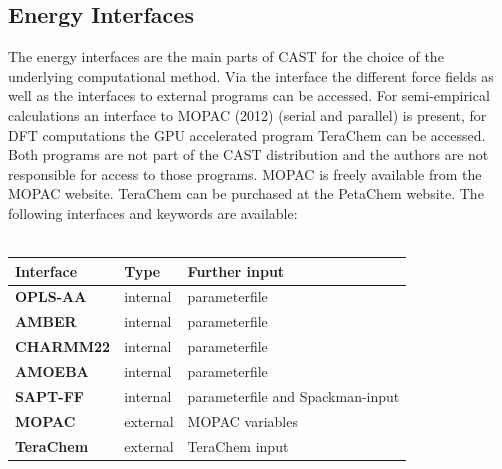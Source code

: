 \documentclass[10pt,a4paper]{article} %
\newif\ifverbose %
\begin{document}
	\subsection{Energy Interfaces}
	The energy interfaces are the main parts of \ac{CAST} for the choice of the underlying computational method. Via the interface the different force fields as well as the interfaces to external programs can be accessed. For semi-empirical calculations an interface to \ac{MOPAC} (2012) (serial\supercite{mopac} and parallel\supercite{mopac_parallel}) is present, for \ac{DFT} computations the \ac{GPU} accelerated program TeraChem\supercite{terachem} can be accessed. Both programs are not part of the \ac{CAST} distribution and the authors are not responsible for access to those programs. \ac{MOPAC}\supercite{mopac, mopac_parallel} is freely available from the \ac{MOPAC} website. TeraChem\supercite{terachem} can be purchased at the PetaChem website.
	The following interfaces and keywords are available:\\~\\
	\begin{tabularx}{\textwidth}{l|l|l}
		Interface & Type & Further input \\
		\hline
		\textbf{OPLS-AA} & internal & parameterfile \\
		\textbf{AMBER} & internal & parameterfile \\
		\textbf{CHARMM22} & internal & parameterfile \\
		\textbf{AMOEBA} & internal & parameterfile\\
		\textbf{SAPT-FF} & internal &parameterfile and Spackman-input\\
		\textbf{MOPAC} & external & MOPAC variables\\
		\textbf{TeraChem} & external & TeraChem input\\
	\end{tabularx}	\\~\\
	\ifverbose
	In contrast to the force fields, the \ac{MOPAC} and TeraChem interfaces do not need correct force field parameters. The coordinate file has to be in TINKER\supercite{tinker} format, however, it can be generated with arbitrary parameters.
	\fi
\end{document}
